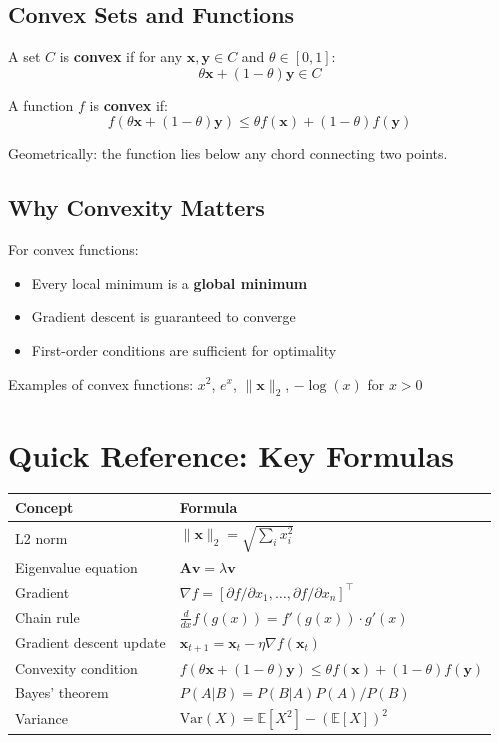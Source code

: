 \documentclass[../main.tex]{subfiles}
\begin{document}
\subsection*{Convex Sets and Functions}

A set $C$ is \textbf{convex} if for any $\mathbf{x}, \mathbf{y} \in C$ and $\theta \in [0,1]$:
\[
\theta \mathbf{x} + (1-\theta)\mathbf{y} \in C
\]

A function $f$ is \textbf{convex} if:
\[
f(\theta \mathbf{x} + (1-\theta)\mathbf{y}) \leq \theta f(\mathbf{x}) + (1-\theta) f(\mathbf{y})
\]

Geometrically: the function lies below any chord connecting two points.

\subsection*{Why Convexity Matters}

For convex functions:
\begin{itemize}
    \item Every local minimum is a \textbf{global minimum}
    \item Gradient descent is guaranteed to converge
    \item First-order conditions are sufficient for optimality
\end{itemize}

Examples of convex functions: $x^2$, $e^x$, $\|\mathbf{x}\|_2$, $-\log(x)$ for $x > 0$

\section*{Quick Reference: Key Formulas}

\begin{center}
\begin{tabular}{ll}
\hline
\textbf{Concept} & \textbf{Formula} \\
\hline
L2 norm & $\|\mathbf{x}\|_2 = \sqrt{\sum_i x_i^2}$ \\
Eigenvalue equation & $\mathbf{A}\mathbf{v} = \lambda\mathbf{v}$ \\
Gradient & $\nabla f = [\partial f/\partial x_1, \ldots, \partial f/\partial x_n]^\top$ \\
Chain rule & $\frac{d}{dx}f(g(x)) = f'(g(x)) \cdot g'(x)$ \\
Gradient descent update & $\mathbf{x}_{t+1} = \mathbf{x}_t - \eta \nabla f(\mathbf{x}_t)$ \\
Convexity condition & $f(\theta\mathbf{x} + (1-\theta)\mathbf{y}) \leq \theta f(\mathbf{x}) + (1-\theta)f(\mathbf{y})$ \\
Bayes' theorem & $P(A|B) = P(B|A)P(A)/P(B)$ \\
Variance & $\text{Var}(X) = \mathbb{E}[X^2] - (\mathbb{E}[X])^2$ \\
\hline
\end{tabular}
\end{center}
\end{document}
